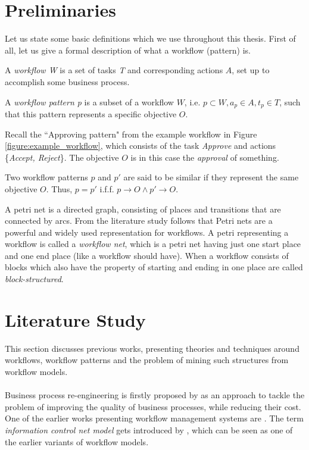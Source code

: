 \documentclass[a4paper,11pt]{article}
\begin{document}
\section{Preliminaries}
Let us state some basic definitions which we use throughout this thesis.
First of all, let us give a formal description of what a workflow (pattern) is.
\begin{defn}[Workflow]
A \textit{workflow W} is a set of tasks \textit{T} and corresponding actions $A$, set up to accomplish some business process.
\end{defn}

\begin{defn}
A \textit{workflow pattern p} is a subset of a workflow $W$, i.e. $p \subset W, a_p \in A, t_p \in T$, such that this pattern represents a specific objective $O$.
\end{defn}
Recall the ``Approving pattern" from the example workflow in Figure \ref{figure:example_workflow}, which consists of the task \textit{Approve} and actions \{\textit{Accept, Reject}\}. The objective $O$ is in this case the \textit{approval} of something.

\begin{defn}
Two workflow patterns $p$ and $p'$ are said to be similar if they represent the same objective $O$. Thus, $p=p'$ i.f.f. $p \rightarrow O \wedge p' \rightarrow O$.
\end{defn}

\begin{defn}
A petri net is a directed graph, consisting of places and transitions that are connected by arcs. From the literature study follows that Petri nets are a powerful and widely used representation for workflows. A petri representing a workflow is called a \textit{workflow net}, which is a petri net having just one start place and one end place (like a workflow should have). When a workflow consists of blocks which also have the property of starting and ending in one place are called \textit{block-structured}. 
\end{defn}


\section{Literature Study}
\label{section:literature}
This section discusses previous works, presenting theories and techniques around workflows, workflow patterns and the problem of mining such structures from workflow models.\\
\\
Business process re-engineering is firstly proposed by \cite{Hammer1990} as an approach to tackle the problem of improving the quality of business processes, while reducing their cost. One of the earlier works presenting workflow management systems are \cite{EngelGLT79,Ellis1982}. The term \textit{information control net model} gets introduced by \cite{Ellis1982}, which can be seen as one of the earlier variants of workflow models. 
\end{document}
